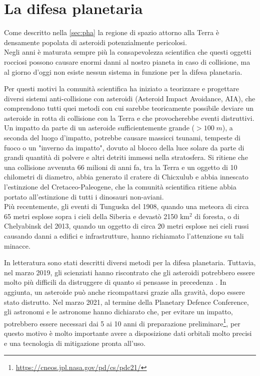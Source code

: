 \section{La difesa planetaria}
Come descritto nella \cref{sec:pha} la regione di spazio attorno alla Terra è densamente popolata di asteroidi potenzialmente pericolosi.\\
Negli anni è maturata sempre più la consapevolezza scientifica che questi oggetti rocciosi possono causare enormi danni al nostro pianeta in caso di collisione, ma al giorno d'oggi non esiste nessun sistema in funzione per la difesa planetaria.

Per questi motivi la comunità scientifica ha iniziato a teorizzare e progettare diversi sistemi anti-collisione con asteroidi (Asteroid Impact Avoidance, AIA), che comprendono tutti quei metodi con cui sarebbe teoricamente possibile deviare un asteroide in rotta di collisione con la Terra e che provocherebbe eventi distruttivi.\\
Un impatto da parte di un asteroide sufficientemente grande ($> 100\; m$), a seconda del luogo d'impatto, potrebbe causare massicci tsunami, tempeste di fuoco o un "inverno da impatto", dovuto al blocco della luce solare da parte di grandi quantità di polvere e altri detriti immessi nella stratosfera. Si ritiene che una collisione avvenuta 66 milioni di anni fa, tra la Terra e un oggetto di 10 chilometri di diametro, abbia generato il cratere di Chicxulub e abbia innescato l'estinzione del Cretaceo-Paleogene, che la comunità scientifica ritiene abbia portato all'estinzione di tutti i dinosauri non-aviani.\\
Più recentemente, gli eventi di Tunguska del 1908, quando una meteora di circa 65 metri esplose sopra i cieli della Siberia e devastò 2150 km$^2$ di foresta, o di Chelyabinsk del 2013, quando un oggetto di circa 20 metri esplose nei cieli russi causando danni a edifici e infrastrutture, hanno richiamato l'attenzione su tali minacce.

In letteratura sono stati descritti diversi metodi per la difesa planetaria. Tuttavia, nel marzo 2019, gli scienziati hanno riscontrato che gli asteroidi potrebbero essere molto più difficili da distruggere di quanto si pensasse in precedenza \citep{el_mir_new_2019}. In aggiunta, un asteroide può anche ricompattarsi grazie alla gravità, dopo essere stato distrutto. Nel marzo 2021, al termine della Planetary Defence Conference, gli astronomi e le astronome hanno dichiarato che, per evitare un impatto, potrebbero essere necessari dai 5 ai 10 anni di preparazione preliminare\footnote{\href{https://cneos.jpl.nasa.gov/pd/cs/pdc21/}{https://cneos.jpl.nasa.gov/pd/cs/pdc21/}}, per questo motivo è molto importante avere a disposizione dati orbitali molto precisi e una tecnologia di mitigazione pronta all'uso.

